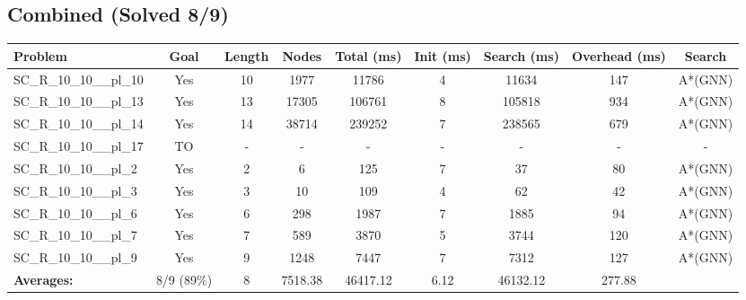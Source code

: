 \documentclass{article}
\begin{document}
\subsection*{Combined (Solved 8/9)}
\begin{tabular}{lcccccccc}
\toprule
Problem & Goal & Length & Nodes & Total (ms) & Init (ms) & Search (ms) & Overhead (ms) & Search \\
\midrule
SC\_R\_10\_10\_\_pl\_10 & Yes & 10 & 1977 & 11786 & 4 & 11634 & 147 & A*(GNN) \\
SC\_R\_10\_10\_\_pl\_13 & Yes & 13 & 17305 & 106761 & 8 & 105818 & 934 & A*(GNN) \\
SC\_R\_10\_10\_\_pl\_14 & Yes & 14 & 38714 & 239252 & 7 & 238565 & 679 & A*(GNN) \\
SC\_R\_10\_10\_\_pl\_17 & TO & - & - & - & - & - & - & - \\
SC\_R\_10\_10\_\_pl\_2 & Yes & 2 & 6 & 125 & 7 & 37 & 80 & A*(GNN) \\
SC\_R\_10\_10\_\_pl\_3 & Yes & 3 & 10 & 109 & 4 & 62 & 42 & A*(GNN) \\
SC\_R\_10\_10\_\_pl\_6 & Yes & 6 & 298 & 1987 & 7 & 1885 & 94 & A*(GNN) \\
SC\_R\_10\_10\_\_pl\_7 & Yes & 7 & 589 & 3870 & 5 & 3744 & 120 & A*(GNN) \\
SC\_R\_10\_10\_\_pl\_9 & Yes & 9 & 1248 & 7447 & 7 & 7312 & 127 & A*(GNN) \\
\textbf{Averages:} & 8/9 (89\%) & 8 & 7518.38 & 46417.12 & 6.12 & 46132.12 & 277.88 & \\
\bottomrule
\end{tabular}
\\[0.7cm]
\end{document}
